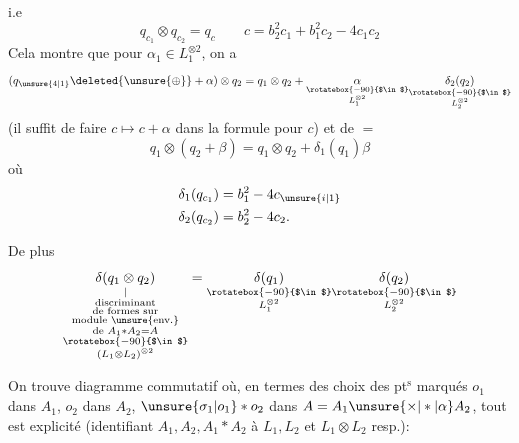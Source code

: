 i.e
\[
q_{c_1}\otimes q_{c_2}=q_c\qquad c=b_2^2c_1+b_1^2c_2-4c_1c_2
\]
Cela montre que pour $\alpha_1\in L_1^{\otimes 2}$, on a
\[
(q_{\unsure{4|1}}\deleted{\unsure{\oplus}}+\alpha)\otimes q_2=q_1\otimes q_2+
\underset{\substack{\rotatebox{-90}{$\in$}\\L_1^{\otimes 2}}}{\alpha}
\underset{\substack{\rotatebox{-90}{$\in$}\\L_2^{\otimes 2}}}{\delta_2(q_2)}
\]
(il suffit de faire $c\mapsto c+\alpha$ dans la formule
pour $c$) et de $=$ 
\[
q_1\otimes(q_2+\beta)=q_1\otimes q_2+\delta_1(q_1)\beta
\]
où
\[
\begin{aligned}
\delta_1(q_{c_1})&=b_1^2-4c_{\unsure{i|1}}\\
\delta_2(q_{c_2})&=b_2^2-4c_2 .
\end{aligned}
\]

De plus
\[
\underset{\substack{\vert\\\text{discriminant}\\\text{de formes sur}\\\text{module \unsure{env.}}\\\text{de }A_1*A_2=A\\\rotatebox{-90}{$\in$}\\(L_1\otimes L_2)^{\otimes 2}}}{\delta(q_1\otimes q_2)}
=\underset{\substack{\rotatebox{-90}{$\in$}\\L_1^{\otimes 2}}}{\delta(q_1)}
\underset{\substack{\rotatebox{-90}{$\in$}\\L_2^{\otimes 2}}}{\delta(q_2)}
\]

On trouve diagramme commutatif
où, en termes des  choix des pt$^{\mathrm s}$ marqués
$o_1$ dans $A_1$, $o_2$ dans $A_2$, $\unsure{\sigma_1|o_1}*o_2$ dans $A=A_1\unsure{\times|*|\alpha}A_2$,
tout est explicité (identifiant $A_1,A_2,A_1*A_2$ à
$L_1,L_2$ et $L_1\otimes L_2$ resp.):
